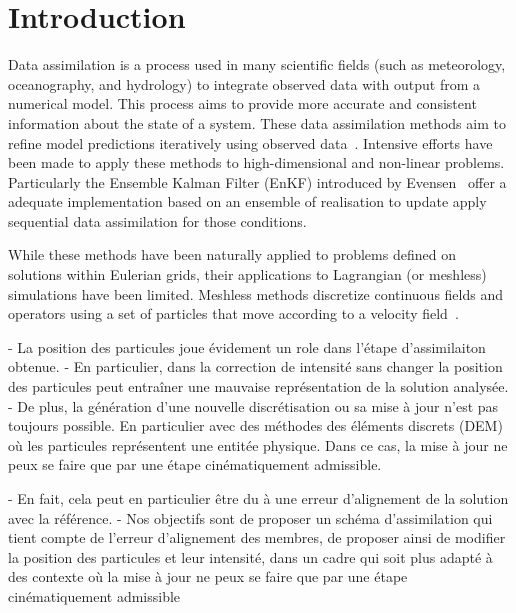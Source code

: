 
\section{Introduction}

Data assimilation is a process used in many scientific fields (such as meteorology, oceanography, and hydrology) to integrate observed data with output from a numerical model.  This process aims to provide more accurate and consistent information about the state of a system. These data assimilation methods aim to refine model predictions iteratively using observed data~\cite{bocquet_introduction_2014}. Intensive efforts have been made to apply these methods to high-dimensional and non-linear problems.
Particularly the Ensemble Kalman Filter (EnKF) introduced by Evensen~\cite{evensen_sequential_1994} offer a adequate implementation based on an ensemble of realisation to update apply sequential data assimilation for those conditions.

While these methods have been naturally applied to problems defined on solutions within Eulerian grids, their applications to Lagrangian (or meshless) simulations have been limited. Meshless methods discretize continuous fields and operators using a set of particles that move according to a velocity field~\cite{s_li_meshfree_2004}.



- La position des particules joue évidement un role dans l'étape d'assimilaiton obtenue.
- En particulier, dans  la correction de intensité sans changer la position des particules peut entraîner une mauvaise représentation de la solution analysée.
- De plus, la génération d'une nouvelle discrétisation ou sa mise à jour n'est pas toujours possible. En particulier avec des méthodes des éléments discrets (DEM) où les particules représentent une entitée physique. Dans ce cas, la mise à jour ne peux se faire que par une étape cinématiquement admissible.

- En fait, cela peut en particulier être du à une erreur d'alignement de la solution avec la référence.
- Nos objectifs sont de proposer un schéma d'assimilation qui tient compte de l’erreur d’alignement des membres, de proposer ainsi de modifier la position des particules et leur intensité, dans un cadre qui soit plus adapté à des contexte où la mise à jour ne peux se faire que par une étape cinématiquement admissible


